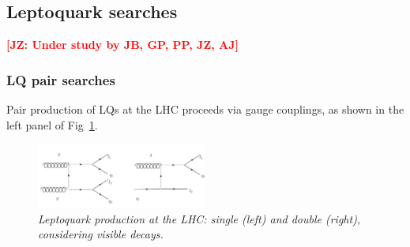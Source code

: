 \documentclass[11pt]{cernrep}
\def\JZ#1{{\bf  \textcolor{red}{[JZ: {#1}]}}}
\begin{document}
\subsection{Leptoquark searches}

\JZ{Under study by JB, GP, PP, JZ, AJ}

\subsubsection{LQ pair searches}

Pair production of LQs at the LHC proceeds via gauge couplings, as shown in the left panel of Fig~\ref{fig:LQvisible}.

 \begin{figure}[!htp]
  \centering
  \includegraphics[width=0.5\textwidth]{./figures/LQ_visible.png} 
  \caption{\it Leptoquark production at the LHC: single (left) and double (right), considering visible decays.}
\label{fig:LQvisible}
\end{figure}
\end{document}
